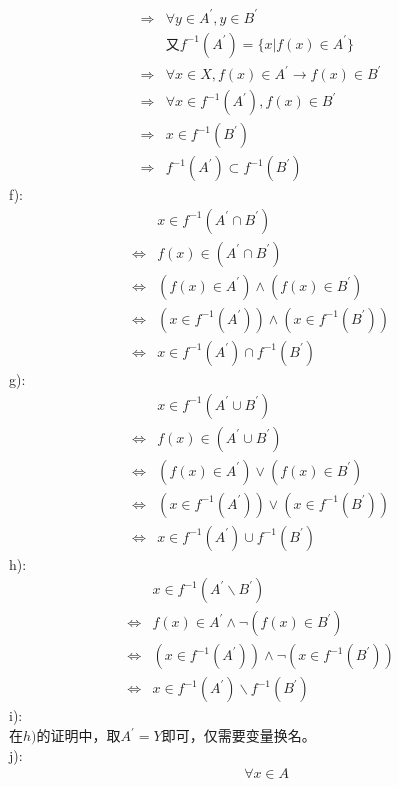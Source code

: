 \begin{solution}
\begin{align*}
\Rightarrow& \forall y\in A^\prime ,y\in B^\prime\\
&\text{又} f^{-1}(A^\prime)=\{x|f(x)\in A^\prime\}\\
\Rightarrow& \forall x\in X,f(x)\in A^\prime \to f(x)\in B^\prime\\
\Rightarrow& \forall x\in f^{-1}(A^\prime), f(x)\in B^\prime\\
\Rightarrow& x\in f^{-1}(B^\prime)\\
\Rightarrow& f^{-1}(A^\prime)\subset f^{-1}(B^\prime)
\end{align*}
f):\\
\begin{align*}
&x\in f^{-1}(A^\prime \cap B^\prime)\\
\Leftrightarrow& f(x)\in (A^\prime \cap B^\prime)\\
\Leftrightarrow& (f(x) \in A^\prime)\land (f(x)\in B^\prime)\\
\Leftrightarrow& (x\in f^{-1}(A^\prime))\land (x\in f^{-1}(B^\prime))\\
\Leftrightarrow& x\in f^{-1}(A^\prime)\cap f^{-1}(B^\prime) 
\end{align*}
\newpage
g):\\
\begin{align*}
&x\in f^{-1}(A^\prime \cup B^\prime)\\
\Leftrightarrow& f(x)\in (A^\prime \cup B^\prime)\\
\Leftrightarrow& (f(x) \in A^\prime)\lor (f(x)\in B^\prime)\\
\Leftrightarrow& (x\in f^{-1}(A^\prime))\lor (x\in f^{-1}(B^\prime))\\
\Leftrightarrow& x\in f^{-1}(A^\prime)\cup f^{-1}(B^\prime) 
\end{align*}
h):\\
\begin{align*}
&x\in f^{-1}(A^\prime \backslash B^\prime)\\
\Leftrightarrow& f(x)\in A^\prime\land \lnot( f(x)\in B^\prime)\\
\Leftrightarrow& (x\in f^{-1}(A^\prime))\land \lnot (x\in f^{-1}(B^\prime))\\
\Leftrightarrow& x\in f^{-1}(A^\prime)\backslash f^{-1}(B^\prime)
\end{align*}
i):\\
在$h)$的证明中，取$A^\prime =Y$即可，仅需要变量换名。\\
j):\\
\begin{align*}
&\forall x\in A\\

\end{align*}
\end{solution}

